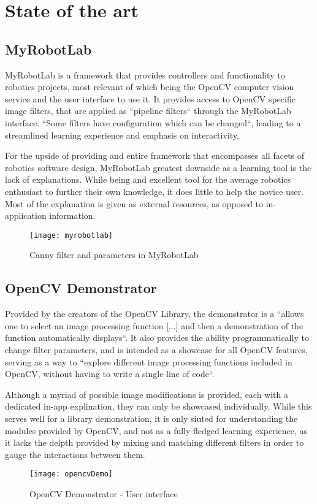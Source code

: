 \chapter{State of the art}

\section{MyRobotLab}

MyRobotLab is a framework that provides controllers and functionality to robotics projects, most
relevant of which being the OpenCV computer vision service and the user interface to use it.
It provides access to OpenCV specific image filters, that are applied as ``pipeline filters`` through
the MyRobotLab interface. ``Some filters have configuration which can be changed``, leading to a
streamlined learning experience and emphasis on interactivity. \cite{myRobotLab}

For the upside of providing and entire framework that encompasses all facets of robotics software
design, MyRobotLab greatest downside as a learning tool is the lack of explanations. While being
and excellent tool for the average robotics enthusiast to further their own knowledge, it does little
to help the novice user. Most of the explanation is given as external resources, as opposed to
in-application information.

\begin{figure}[H]
	\texttt{[image: myrobotlab]}
	\caption{Canny filter and parameters in MyRobotLab \cite{myRobotLab}}
\end{figure}


\section{OpenCV Demonstrator}

Provided by the creators of the OpenCV Library, the demonstrator is a ``allows one to select an image
processing function [...] and then a demonstration of the function automatically displays``.
It also provides the ability programmatically to change filter parameters, and is intended as a showcase
for all OpenCV features, serving as a way to ``explore different image processing functions included in 
OpenCV, without having to write a single line of code``. \cite{opencvDemo}

Although a myriad of possible image modifications is provided, each with a dedicated in-app explination,
they can only be showcased individually.
While this serves well for a library demonstration, it is only siuted for understanding the modules
provided by OpenCV, and not as a fully-fledged learning experience, as it lacks the delpth provided
by mixing and matching different filters in order to gauge the interactions between them.

\begin{figure}[H]
	\texttt{[image: opencvDemo]}
	\caption{OpenCV Demonstrator - User interface \cite{opencvDemo}}
\end{figure}

